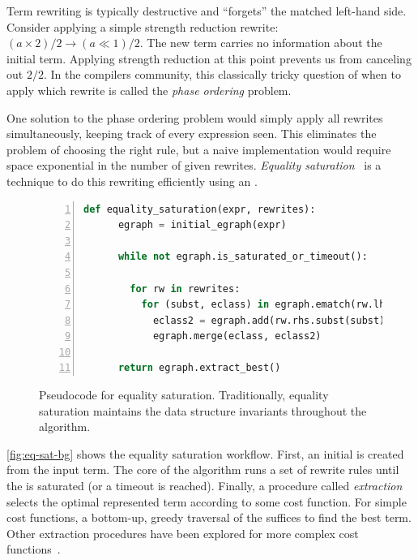 Term rewriting is typically destructive and ``forgets'' the matched
  left-hand side.
Consider applying a simple strength reduction rewrite:
  ${ (a \times 2) / 2 \to (a \ll 1) / 2 }$.
The new term carries no
  information about the initial term.
Applying strength reduction at this point prevents us from canceling out $2/2$.
In the compilers community, this classically tricky question of when to apply
  which rewrite is called the \textit{phase ordering} problem.

One solution to the phase ordering problem would simply apply all
  rewrites simultaneously, keeping track of every expression seen.
This eliminates the problem of choosing the right rule, but
  a naive implementation would require space exponential in the number
  of given rewrites.
\textit{Equality saturation}~\cite{eqsat, eqsat-llvm} is a technique to do this
  rewriting efficiently using an \egraph.

\begin{figure}
  \centering
  \begin{lstlisting}[language=Python, gobble=4, numbers=left, basicstyle=\small\ttfamily, xleftmargin=40mm]
    def equality_saturation(expr, rewrites):
      egraph = initial_egraph(expr)

      while not egraph.is_saturated_or_timeout():

        for rw in rewrites:
          for (subst, eclass) in egraph.ematch(rw.lhs):
            eclass2 = egraph.add(rw.rhs.subst(subst))
            egraph.merge(eclass, eclass2)

      return egraph.extract_best()
  \end{lstlisting}
  \caption{
    Pseudocode for equality saturation.
    Traditionally, equality saturation maintains the \egraph data structure
      invariants throughout the algorithm.
  }
  \label{fig:eq-sat-bg}
\end{figure}

\autoref{fig:eq-sat-bg} shows the equality saturation workflow.
First, an initial \egraph is created from the input term.
The core of the algorithm runs a set of rewrite rules until the \egraph is
  saturated (or a timeout is reached).
Finally, a procedure called \textit{extraction} selects the optimal represented
  term according to some cost function.
For simple cost functions, a bottom-up, greedy traversal of the \egraph suffices
  to find the best term.
Other extraction procedures have been explored for more complex cost
  functions~\cite{spores, wu_siga19}.

